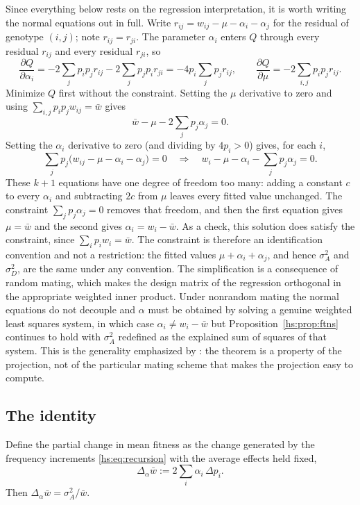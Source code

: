 Since everything below rests on the regression interpretation, it is worth writing the normal equations out in full. Write $r_{ij} = w_{ij} - \mu - \alpha_i - \alpha_j$ for the residual of genotype $(i,j)$; note $r_{ij} = r_{ji}$. The parameter $\alpha_i$ enters $Q$ through every residual $r_{ij}$ and every residual $r_{ji}$, so
\[
\frac{\partial Q}{\partial \alpha_i} = -2\sum_j p_ip_j r_{ij} - 2\sum_j p_jp_i r_{ji} = -4p_i\sum_j p_j r_{ij},
\qquad
\frac{\partial Q}{\partial \mu} = -2\sum_{i,j}p_ip_jr_{ij}.
\]
Minimize $Q$ first without the constraint. Setting the $\mu$ derivative to zero and using $\sum_{i,j}p_ip_jw_{ij} = \bar w$ gives
\[
\bar w - \mu - 2\textstyle\sum_j p_j\alpha_j = 0 .
\]
Setting the $\alpha_i$ derivative to zero (and dividing by $4p_i > 0$) gives, for each $i$,
\[
\sum_j p_j \big(w_{ij} - \mu - \alpha_i - \alpha_j\big) = 0
\quad\Longrightarrow\quad
w_i - \mu - \alpha_i - \textstyle\sum_j p_j\alpha_j = 0 .
\]
These $k+1$ equations have one degree of freedom too many: adding a constant $c$ to every $\alpha_i$ and subtracting $2c$ from $\mu$ leaves every fitted value unchanged. The constraint $\sum_j p_j \alpha_j = 0$ removes that freedom, and then the first equation gives $\mu = \bar w$ and the second gives $\alpha_i = w_i - \bar w$. As a check, this solution does satisfy the constraint, since $\sum_i p_i w_i = \bar w$. The constraint is therefore an identification convention and not a restriction: the fitted values $\mu + \alpha_i + \alpha_j$, and hence $\sigma^2_A$ and $\sigma^2_D$, are the same under any convention. The simplification is a consequence of random mating, which makes the design matrix of the regression orthogonal in the appropriate weighted inner product. Under nonrandom mating the normal equations do not decouple and $\alpha$ must be obtained by solving a genuine weighted least squares system, in which case $\alpha_i \ne w_i - \bar w$ but Proposition~\ref{hs:prop:ftns} continues to hold with $\sigma^2_A$ redefined as the explained sum of squares of that system. This is the generality emphasized by \citet{hs:ewens2004mathematical}: the theorem is a property of the projection, not of the particular mating scheme that makes the projection easy to compute.

\subsection{The identity}

\begin{proposition}
\label{hs:prop:ftns}
Define the partial change in mean fitness as the change generated by the frequency increments \eqref{hs:eq:recursion} with the average effects held fixed,
\[
\Delta_\alpha \bar w := 2\sum_i \alpha_i \,\Delta p_i .
\]
Then $\Delta_\alpha \bar w = \sigma^2_A/\bar w$.
\end{proposition}

